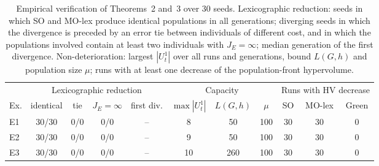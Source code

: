 \begin{table}[t]
\centering
\caption{Empirical verification of Theorems~2 and~3 over 30 seeds. Lexicographic reduction: seeds in which SO and MO-lex produce identical populations in all generations; diverging seeds in which the divergence is preceded by an error tie between individuals of different cost, and in which the populations involved contain at least two individuals with $J_E=\infty$; median generation of the first divergence. Non-deterioration: largest $|U_t^1|$ over all runs and generations, bound $L(G,h)$ and population size $\mu$; runs with at least one decrease of the population-front hypervolume.}
\label{tab:checks}
\small
\setlength{\tabcolsep}{4pt}
\begin{tabular}{lcccccccccc}
\toprule
 & \multicolumn{4}{c}{Lexicographic reduction} & \multicolumn{3}{c}{Capacity} & \multicolumn{3}{c}{Runs with HV decrease} \\
\cmidrule(lr){2-5}\cmidrule(lr){6-8}\cmidrule(lr){9-11}
Ex. & identical & tie & $J_E{=}\infty$ & first div. & $\max|U_t^1|$ & $L(G,h)$ & $\mu$ & SO & MO-lex & Green \\
\midrule
E1 & 30/30 & 0/0 & 0/0 & -- & 8 & 50 & 100 & 30 & 30 & 0 \\
E2 & 30/30 & 0/0 & 0/0 & -- & 9 & 50 & 100 & 30 & 30 & 0 \\
E3 & 30/30 & 0/0 & 0/0 & -- & 10 & 260 & 100 & 30 & 30 & 0 \\
\bottomrule
\end{tabular}
\end{table}
